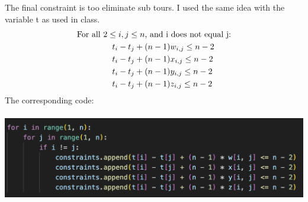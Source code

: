 \documentclass[12pt]{extarticle}
\begin{document}
The final constraint is too eliminate sub tours. I used the same idea with the variable t as used in class.
\begin{align*}
&\text{For all } 2 \leq i, j \leq n \text{, and i does not equal j:} \\
&\hspace{1.5cm}t_i - t_j + (n-1)w_{i,j} \leq n-2 \\
&\hspace{1.5cm}t_i - t_j + (n-1)x_{i,j} \leq n-2 \\
&\hspace{1.5cm}t_i - t_j + (n-1)y_{i,j} \leq n-2 \\
&\hspace{1.5cm}t_i - t_j + (n-1)z_{i,j} \leq n-2 \\
\end{align*}
The corresponding code: \\ \\
\includegraphics[scale = .5]{images/constraints6.png} \\
\end{document}
